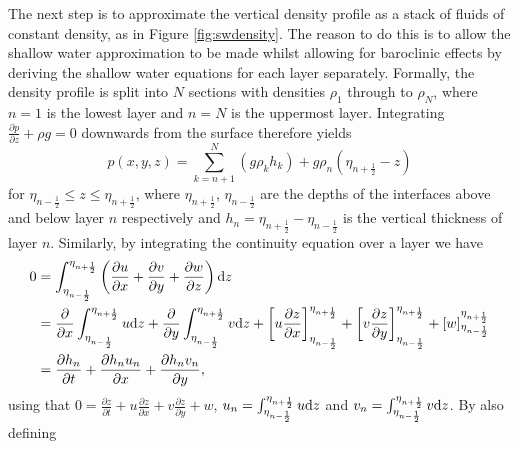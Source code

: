 \documentclass[10pt,a4paper]{article}
\begin{document}
    The next step is to approximate the vertical density profile as a stack of
    fluids of constant density, as in Figure \ref{fig:swdensity}. 
    The reason to do this is to allow the shallow
    water approximation to be made whilst allowing for baroclinic effects by 
    deriving the shallow water equations for each layer separately. Formally, 
    the density profile is split into $N$ sections with densities 
    $\rho_{1}$ through to $\rho_{N}$, where $n=1$ is the lowest layer and $n=N$
    is the uppermost layer. Integrating $\frac{\partial p}{\partial z} + \rho g=0$
    downwards from the surface therefore yields 
    \begin{equation}
    p(x,y,z)=\sum^{N}_{k=n+1}\left(g \rho_{k} h_{k} \right) + g \rho_{n}\left(\eta_{n+\frac{1}{2}} - z \right)
    \end{equation}
    for $\eta_{n-\frac{1}{2}}\leq z \leq \eta_{n+\frac{1}{2}}$, where $\eta_{n+\frac{1}{2}}$,
    $\eta_{n-\frac{1}{2}}$ are the depths of the interfaces above and below layer $n$
    respectively and $h_{n} = \eta_{n+\frac{1}{2}} -\eta_{n-\frac{1}{2}}$ is the vertical
     thickness  of layer $n$. Similarly, by integrating the continuity equation over a layer
     we have
     \begin{equation}
     \begin{split}
     0 &=\int^{\eta_{n+\frac{1}{2}}}_{\eta_{n-\frac{1}{2}}}\left(\frac{\partial u}{\partial x} + \frac{\partial v}{\partial y} +\frac{\partial w}{\partial z} \right){\rm d} z \\
     &=\frac{\partial }{\partial x}\int^{\eta_{n+\frac{1}{2}}}_{\eta_{n-\frac{1}{2}}} u{\rm d} z +
     \frac{\partial }{\partial y}\int^{\eta_{n+\frac{1}{2}}}_{\eta_{n-\frac{1}{2}}} v{\rm d} z
      +  \left[ u   \frac{\partial z}{\partial x} \right]^{\eta_{n+\frac{1}{2}}}_{\eta_{n-\frac{1}{2}}} 
      +  \left[ v  \frac{\partial z}{\partial y}\right]^{\eta_{n+\frac{1}{2}}}_{\eta_{n-\frac{1}{2}}}  +
      \left[ w \right]^{\eta_{n+\frac{1}{2}}}_{\eta_{n-\frac{1}{2}}} \\
     &=\frac{\partial h_{n} }{\partial t} +\frac{\partial h_{n} u_{n}}{\partial x}+
     \frac{\partial h_{n} v_{n} }{\partial y},      \\
     \end{split}
     \end{equation}
   using that $0 =  \frac{\partial z }{\partial t} + u \frac{\partial z}{\partial x} 
   + v \frac{\partial z}{\partial y} + w$, $u_{n} =\int^{\eta_{n+\frac{1}{2}}}_{\eta_{n-\frac{1}{2}}} u{\rm d} z$ and $v_{n} =\int^{\eta_{n+\frac{1}{2}}}_{\eta_{n-\frac{1}{2}}} v{\rm d} z$. By also defining 
\end{document}
